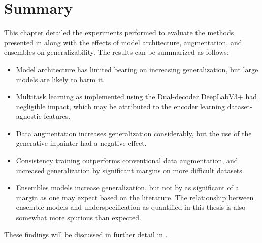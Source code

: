 \section{Summary}
This chapter detailed the experiments performed to evaluate the methods presented in  along with the effects of model architecture, augmentation, and ensembles on generalizability. The results can be summarized as follows:
\begin{itemize}
    \item Model architecture has limited bearing on increasing generalization, but large models are likely to harm it.
    \item Multitask learning as implemented using the Dual-decoder DeepLabV3+ had negligible impact, which may be attributed to the encoder learning dataset-agnostic features.
    \item Data augmentation increases generalization considerably, but the use of the generative inpainter had a negative effect.
    \item Consistency training outperforms conventional data augmentation, and increased generalization by significant margins on more difficult datasets.
    \item Ensembles models increase generalization, but not by as significant of a margin as one may expect based on the literature. The relationship between ensemble models and underspecification as quantified in this thesis is also somewhat more spurious than expected.
\end{itemize}
These findings will be discussed in further detail in . 